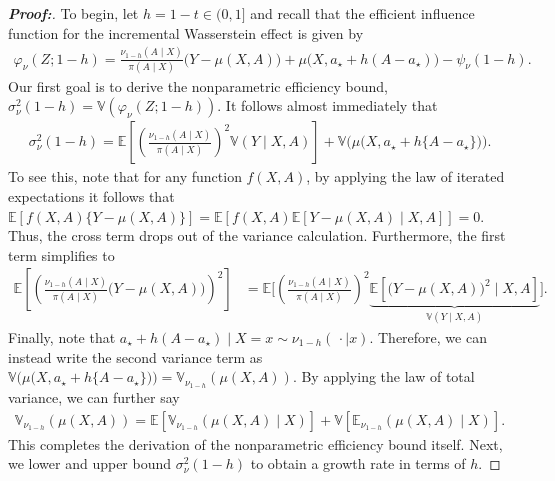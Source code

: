 \documentclass[11pt,twoside]{article}
\theoremstyle{definition}
\theoremstyle{remark}
\begin{document}
\begin{proof}[\textbf{Proof:}]
To begin, let $h = 1 - t \in (0, 1]$ and recall that the efficient influence function for the incremental Wasserstein effect is given by
\begin{align*}
    \varphi_\nu(Z; 1-h) =  \frac{\nu_{1-h}(A \! \mid \! X)}{\pi(A \! \mid \! X)}\big(Y - \mu(X, A) \big) +  \mu\big(X, a_\star + h(A - a_\star) \big) - \psi_\nu(1 - h).
\end{align*}
Our first goal is to derive the nonparametric efficiency bound, $\sigma^2_\nu(1-h) = \mathbb{V}(\varphi_\nu(Z; 1-h))$. It follows almost immediately that
\begin{align*}
     \sigma^2_\nu(1-h) = \mathbb{E}\left[\left(\frac{\nu_{1-h}(A \! \mid \! X)}{\pi(A \! \mid \! X)}\right)^2 \mathbb{V}(Y \mid X, A)  \right] + \mathbb{V}\big(\mu\big(X, a_\star + h\{A - a_\star\}\big)\big).
\end{align*}
To see this, note that for any function $f(X, A)$, by applying the law of iterated expectations it follows that $\mathbb{E}\left[f(X, A)\{Y - \mu(X, A)\}\right] = \mathbb{E}\left[ f(X, A)\mathbb{E}\left[Y - \mu(X, A)\mid X, A\right]\right] = 0$. Thus, the cross term drops out of the variance calculation. Furthermore, the first term simplifies to
\begin{align*}
    \mathbb{E}\left[\left(  \frac{\nu_{1-h}(A \! \mid \! X)}{\pi(A \! \mid \! X)}\big(Y - \mu(X, A) \big)\right)^2 \right] &= \mathbb{E}\Bigg[ \left( \frac{\nu_{1-h}(A \! \mid \! X)}{\pi(A \! \mid \! X)} \right)^2\underbrace{\mathbb{E} \left[ \big(Y - \mu(X, A) \big)^2 \mid X, A\right]}_{\mathbb{V}(Y \mid X, A)}\Bigg].
\end{align*}
Finally, note that $a_\star + h(A - a_\star) \mid X = x \sim \nu_{1-h}(\, \cdot  \mid x)$. Therefore, we can instead write the second variance term as $\mathbb{V}\big(\mu\big(X, a_\star + h\{A - a_\star\}\big)\big) = \mathbb{V}_{\nu_{1-h}}(\mu(X, A))$.
By applying the law of total variance, we can further say
\begin{align*}
    \mathbb{V}_{\nu_{1-h}}(\mu(X, A)) = \mathbb{E}\left[ \mathbb{V}_{\nu_{1-h}}(\mu(X,A)\mid X)\right] +\mathbb{V}\left[ \mathbb{E}_{\nu_{1-h}}(\mu(X,A)\mid X) \right].
\end{align*}
This completes the derivation of the nonparametric efficiency bound itself. Next, we lower and upper bound $\sigma^2_\nu(1-h)$ to obtain a growth rate in terms of $h$. \bigskip


\end{proof}
\end{document}
